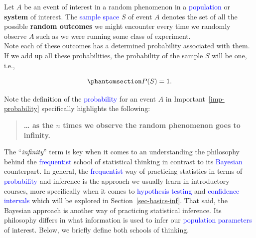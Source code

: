 \documentclass[
  letterpaper,
  DIV=11,
  numbers=noendperiod]{scrreprt}
\newcounter{quartocalloutimpno}
\newcommand{\quartocalloutimp}[1]{\refstepcounter{quartocalloutimpno}\label{#1}}
\begin{document}
\begin{tcolorbox}[enhanced jigsaw, bottomrule=.15mm, breakable, colback=white, leftrule=.75mm, coltitle=black, rightrule=.15mm, bottomtitle=1mm, title=\textcolor{quarto-callout-important-color}{\faExclamation}\hspace{0.5em}{Important \ref*{imp-sample-space}: Definition of sample space}, opacitybacktitle=0.6, toprule=.15mm, titlerule=0mm, arc=.35mm, colbacktitle=quarto-callout-important-color!10!white, toptitle=1mm, colframe=quarto-callout-important-color-frame, left=2mm, opacityback=0]

\quartocalloutimp{imp-sample-space} 

Let \(A\) be an event of interest in a random phenomenon in a
\textcolor{blue}{population} or \textbf{system} of interest. The
\textcolor{blue}{sample space} \(S\) of event \(A\) denotes the set of
all the possible \textbf{random outcomes} we might encounter every time
we randomly observe \(A\) such as we were running some class of
experiment.\\

Note each of these outcomes has a determined probability associated with
them. If we add up all these probabilities, the probability of the
sample \(S\) will be one, i.e.,

\begin{equation}\phantomsection\label{eq-sample-space}{
P(S) = 1.
}\end{equation}

\end{tcolorbox}

Note the definition of the \textcolor{blue}{probability} for an event
\(A\) in Important~\ref{imp-probability} specifically highlights the
following:

\begin{quote}
\textbf{\ldots{} as the \(n\) times we observe the random phenomenon
goes to infinity.}
\end{quote}

The ``\emph{infinity}'' term is key when it comes to an understanding
the philosophy behind the \textcolor{blue}{frequentist} school of
statistical thinking in contrast to its \textcolor{blue}{Bayesian}
counterpart. In general, the \textcolor{blue}{frequentist} way of
practicing statistics in terms of \textcolor{blue}{probability} and
inference is the approach we usually learn in introductory courses, more
specifically when it comes to \textcolor{blue}{hypothesis testing} and
\textcolor{blue}{confidence intervals} which will be explored in
Section~\ref{sec-basics-inf}. That said, the Bayesian approach is
another way of practicing statistical inference. Its philosophy differs
in what information is used to infer our
\textcolor{blue}{population parameters} of interest. Below, we briefly
define both schools of thinking.
\end{document}
